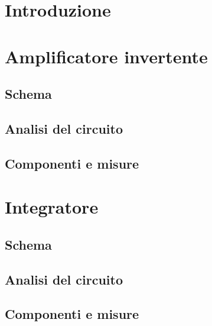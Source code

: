 \section{Introduzione} 
\section{Amplificatore invertente} 
\subsection{Schema} 
\subsection{Analisi del circuito} 
\subsection{Componenti e misure} 
\section{Integratore} 
\subsection{Schema} 
\subsection{Analisi del circuito} 
\subsection{Componenti e misure} 







